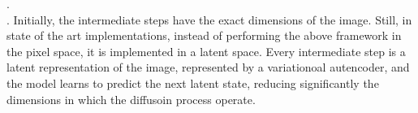 .\\

. Initially, the intermediate steps have the exact dimensions of the image. Still, in state of the art implementations, instead of performing the above framework in the pixel space, it is implemented in a latent space. Every intermediate step is a latent representation of the image, represented by a variationoal autencoder, and the model learns to predict the next latent state, reducing significantly the dimensions in which the diffusoin process operate.\ 